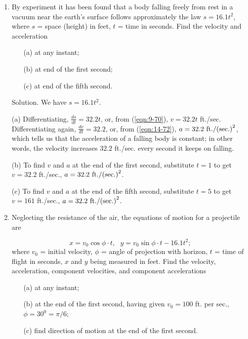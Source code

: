 \begin{enumerate}
\item
By experiment it has been found that a body falling 
freely from rest in a vacuum near the earth's surface follows 
approximately the law $s = 16.1t^2$, where $s$ = space (height) in feet, 
$t$ = time in seconds. Find the velocity and acceleration 

\begin{itemize}
\item[(a)] 
at any instant; 

\item[(b)]
at end of the first second; 

\item[(c)]
at end of the fifth second.
\end{itemize}

Solution. We have $s = 16.1t^2$.

(a) Differentiating, $\frac{ds}{dt} = 32.2 t$, or, from 
(\ref{eqn:9-70}), $v = 32.2t$ ft./sec.
Differentiating again, $\frac{dv}{dt} = 32.2$, or, from 
(\ref{eqn:14-72}), 
$a = 32.2\  \fps2$,
which tells us that the acceleration of a falling body 
is constant; in other words, the velocity increases $32.2$ ft./sec. 
every second it keeps on falling.

(b) To find $v$ and $a$ at the end of the first second, substitute 
$t = 1$ to get $v = 32.2$ ft./sec., $a = 32.2\  \fps2$.

(c) To find $v$ and $a$ at the end of the fifth second, 
substitute $t = 5$ to get $v = 161$ ft./sec., 
$a = 32.2\  \fps2$.

\item
Neglecting the resistance of the air, the equations of motion for a 
projectile are

\[
x = v_0 \cos \phi \cdot t,\ \ \  y = v_0 \sin \phi \cdot t - 16.1 t^2;
\]
where $v_0$ = initial velocity, $\phi$ = angle of projection with 
horizon, $t$ = time of flight in seconds, $x$ and $y$ being 
measured in feet. Find the velocity, acceleration, component velocities, 
and component accelerations 

\begin{itemize}
\item[(a)] 
at any instant; 

\item[(b)]
at the end of the first second, having given $v_0 = 100$ ft. per sec., 
$\phi = 30^0 = \pi/6$; 

\item[(c)]
find direction of motion at the end of the first second.
\end{itemize}


\end{enumerate}
